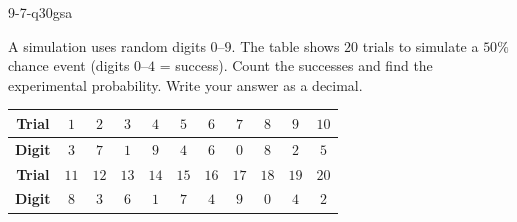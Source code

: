 \begin{practiceQuestion}{9-7-q30}{gsa}
\begin{questionText}
A simulation uses random digits $0$--$9$. The table shows $20$ trials to simulate a $50\%$ chance event (digits $0$--$4$ = success). Count the successes and find the experimental probability. Write your answer as a decimal.

\begin{center}
\begin{tabular}{|c|c|c|c|c|c|c|c|c|c|c|}
\hline
\textbf{Trial} & $1$ & $2$ & $3$ & $4$ & $5$ & $6$ & $7$ & $8$ & $9$ & $10$ \\
\hline
\textbf{Digit} & $3$ & $7$ & $1$ & $9$ & $4$ & $6$ & $0$ & $8$ & $2$ & $5$ \\
\hline
\hline
\textbf{Trial} & $11$ & $12$ & $13$ & $14$ & $15$ & $16$ & $17$ & $18$ & $19$ & $20$ \\
\hline
\textbf{Digit} & $8$ & $3$ & $6$ & $1$ & $7$ & $4$ & $9$ & $0$ & $4$ & $2$ \\
\hline
\end{tabular}
\end{center}
\end{questionText}
\end{practiceQuestion}
